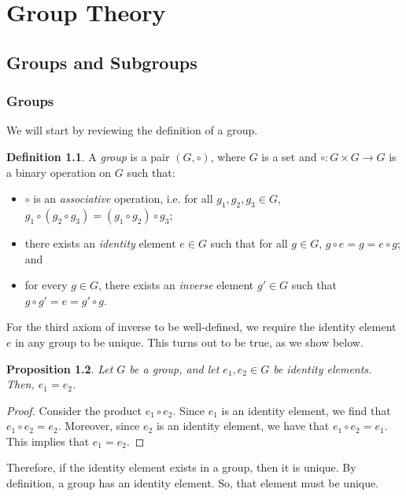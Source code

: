 \documentclass[a4paper, openany]{memoir}
\theoremstyle{definition}
\newtheorem{definition}{Definition}[section]
\theoremstyle{plain}
\newtheorem{proposition}[definition]{Proposition}
\begin{document}
\chapter{Group Theory}
\section{Groups and Subgroups}
\subsection{Groups}
We will start by reviewing the definition of a group.
\begin{definition}
A \emph{group} is a pair $(G, \circ)$, where $G$ is a set and $\circ: G \times G \to G$ is a binary operation on $G$ such that:
\begin{itemize}
    \item $\circ$ is an \emph{associative} operation, i.e. for all $g_1, g_2, g_3 \in G$, $g_1 \circ (g_2 \circ g_3) = (g_1 \circ g_2) \circ g_3$;
    \item there exists an \emph{identity} element $e \in G$ such that for all $g \in G$, $g \circ e = g = e \circ g$; and
    \item for every $g \in G$, there exists an \emph{inverse} element $g' \in G$ such that $g \circ g' = e = g' \circ g$.
\end{itemize}
\end{definition}
For the third axiom of inverse to be well-defined, we require the identity element $e$ in any group to be unique. This turns out to be true, as we show below.
\begin{proposition}
Let $G$ be a group, and let $e_1, e_2 \in G$ be identity elements. Then, $e_1 = e_2$.
\end{proposition}
\begin{proof}
Consider the product $e_1 \circ e_2$. Since $e_1$ is an identity element, we find that $e_1 \circ e_2 = e_2$. Moreover, since $e_2$ is an identity element, we have that $e_1 \circ e_2 = e_1$. This implies that $e_1 = e_2$.
\end{proof}
\noindent Therefore, if the identity element exists in a group, then it is unique. By definition, a group has an identity element. So, that element must be unique.
\end{document}
